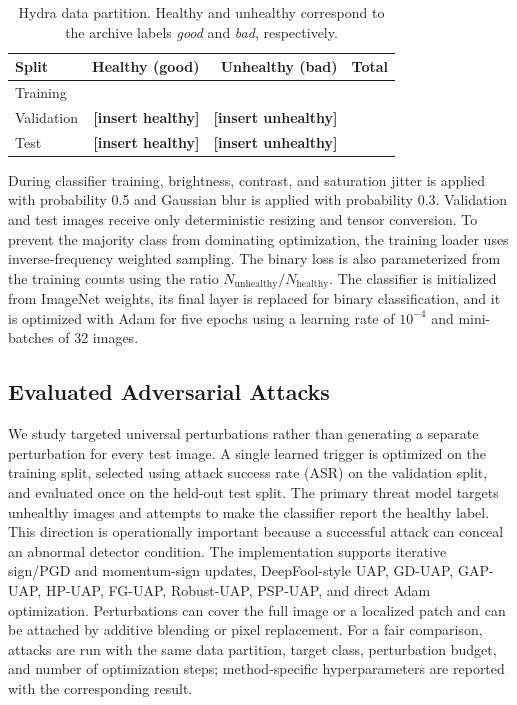 \begin{table}[t]
    \centering
    \caption{Hydra data partition.  Healthy and unhealthy correspond to the
    archive labels \emph{good} and \emph{bad}, respectively.}
    \label{tab:hydra-splits}
    \begin{tabular}{lrrr}
        \hline
        Split & Healthy (good) & Unhealthy (bad) & Total \\
        \hline
        Training   & \NumTrainingHealthy{} & \NumTrainingUnhealthy{} & \NumTrainingImages{} \\
        Validation & \textbf{[insert healthy]} & \textbf{[insert unhealthy]} & \NumValidationImages{} \\
        Test       & \textbf{[insert healthy]} & \textbf{[insert unhealthy]} & \NumTestImages{} \\
        \hline
    \end{tabular}
\end{table}

During classifier training, brightness, contrast, and saturation jitter is
applied with probability 0.5 and Gaussian blur is applied with probability
0.3.  Validation and test images receive only deterministic resizing and tensor
conversion.  To prevent the majority class from dominating optimization, the
training loader uses inverse-frequency weighted sampling.  The binary loss is
also parameterized from the training counts using the ratio
$N_{\mathrm{unhealthy}}/N_{\mathrm{healthy}}$.  The classifier is initialized
from ImageNet weights, its final layer is replaced for binary classification,
and it is optimized with Adam for five epochs using a learning rate of
$10^{-4}$ and mini-batches of 32 images.

\subsection{Evaluated Adversarial Attacks}

We study targeted universal perturbations rather than generating a separate
perturbation for every test image.  A single learned trigger is optimized on
the training split, selected using attack success rate (ASR) on the validation
split, and evaluated once on the held-out test split.  The primary threat model
targets unhealthy images and attempts to make the classifier report the
healthy label.  This direction is operationally important because a successful
attack can conceal an abnormal detector condition.  The implementation supports
iterative sign/PGD and momentum-sign updates, DeepFool-style UAP, GD-UAP,
GAP-UAP, HP-UAP, FG-UAP, Robust-UAP, PSP-UAP, and direct Adam optimization.
Perturbations can cover the full image or a localized patch and can be attached
by additive blending or pixel replacement.  For a fair comparison, attacks are
run with the same data partition, target class, perturbation budget, and number
of optimization steps; method-specific hyperparameters are reported with the
corresponding result.


